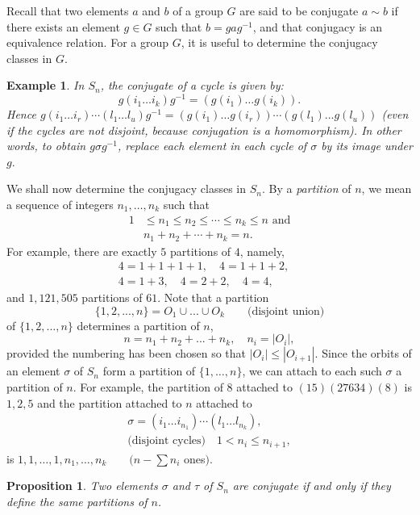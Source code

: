 \documentclass[a4paper,11pt,final]{memoir}%
\newtheorem{proposition}[X]{Proposition}
\newtheorem{example}[X]{Example}
\theoremstyle{nonumberplain}
\begin{document}
Recall that two elements $a$ and $b$ of a group $G$ are said to be conjugate
$a\sim b$ if there exists an element $g\in G$ such that $b=gag^{-1}$, and that
conjugacy is an equivalence relation. For a group $G$, it is useful to
determine the conjugacy classes in $G$.

\begin{example}
\label{ga24} In $S_{n}$, the conjugate of a cycle is given by:
\[
g(i_{1}\ldots i_{k})g^{-1}=(g(i_{1})\ldots g(i_{k})).
\]
Hence $g(i_{1}\ldots i_{r})\cdots(l_{1}\ldots l_{u})g^{-1}=(g(i_{1})\ldots
g(i_{r}))\cdots(g(l_{1})...g(l_{u}))$ (even if the cycles are not disjoint,
because conjugation is a homomorphism). In other words, to obtain $g\sigma
g^{-1}$, replace each element in each cycle of $\sigma$ by its image under
$g.$
\end{example}

We shall now determine the conjugacy classes in $S_{n}$. By a
\emph{partition\/}%
of $n$, we mean a sequence of integers $n_{1},\ldots,n_{k}$ such that
\begin{align*}
1  &  \leq n_{1}\leq n_{2}\leq\cdots\leq n_{k}\leq n\text{ and}\\
&  n_{1}+n_{2}+\cdots+n_{k}=n.
\end{align*}
For example, there are exactly $5$ partitions of $4$, namely,%
\begin{align*}
4=1+1+1+1,\quad4=1+1+2,\quad\\
4=1+3,\quad4=2+2,\quad4=4,
\end{align*}
and $1,121,505$ partitions of $61$. Note that a partition
\[
\{1,2,...,n\}=O_{1}\cup...\cup O_{k}\qquad\text{(disjoint union)}%
\]
of $\{1,2,\ldots,n\}$ determines a partition of $n$,
\[
n=n_{1}+n_{2}+...+n_{k},\quad n_{i}=|O_{i}|,
\]
provided the numbering has been chosen so that $|O_{i}|\leq|O_{i+1}|$. Since
the orbits of an element $\sigma$ of $S_{n}$ form a partition of
$\{1,\ldots,n\}$, we can attach to each such $\sigma$ a partition of $n$. For
example, the partition of $8$ attached to $(15)(27634)(8)$ is $1,2,5$ and the
partition attached to $n$ attached to
\begin{align*}
\sigma=(i_{1}\ldots i_{n_{1}})\cdots(l_{1}\ldots l_{n_{k}}),\\
\text{(disjoint cycles)}\quad1<n_{i}\leq n_{i+1},
\end{align*}
is $1,1,\ldots,1,n_{1},\ldots,n_{k}\qquad(n-%
{\textstyle\sum}
n_{i}$ ones$).$

\begin{proposition}
\label{ga25} Two elements $\sigma$ and $\tau$ of $S_{n}$ are conjugate if and
only if they define the same partitions of $n$.
\end{proposition}
\end{document}

